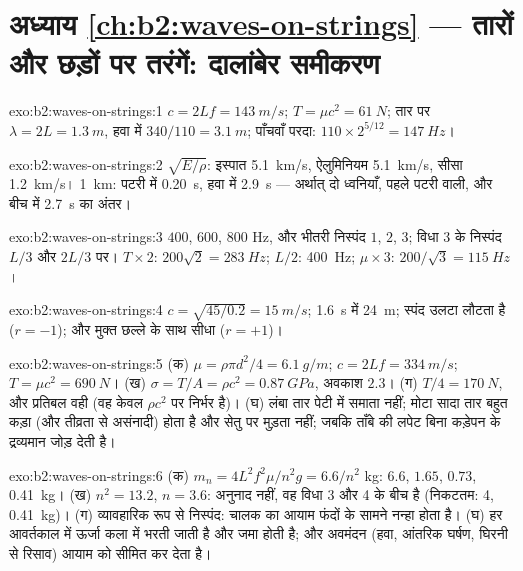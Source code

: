 \section*{अध्याय \ref{ch:b2:waves-on-strings} --- तारों और छड़ों पर तरंगें: दालांबेर समीकरण}

\begin{solution}{exo:b2:waves-on-strings:1}
$c = 2Lf = \qty{143}{m/s}$; $T = \mu c^2 = \qty{61}{N}$; तार पर $\lambda = 2L = \qty{1.3}{m}$,
हवा में $340/110 = \qty{3.1}{m}$; पाँचवाँ परदा: $110 \times 2^{5/12} =
\qty{147}{Hz}$।
\end{solution}

\begin{solution}{exo:b2:waves-on-strings:2}
$\sqrt{E/\rho}$: इस्पात \qty{5.1}{km/s}, ऐलुमिनियम \qty{5.1}{km/s}, सीसा
\qty{1.2}{km/s}। \qty{1}{km}: पटरी में \qty{0.20}{s}, हवा में \qty{2.9}{s} ---
अर्थात् दो ध्वनियाँ, पहले पटरी वाली, और बीच में \qty{2.7}{s} का अंतर।
\end{solution}

\begin{solution}{exo:b2:waves-on-strings:3}
$400$, $600$, $800$ Hz, और भीतरी निस्पंद $1$, $2$, $3$; विधा 3 के निस्पंद
$L/3$ और $2L/3$ पर। $T \times 2$: $200\sqrt2 = \qty{283}{Hz}$; $L/2$: \qty{400}{Hz}; $\mu
\times 3$: $200/\sqrt3 = \qty{115}{Hz}$।
\end{solution}

\begin{solution}{exo:b2:waves-on-strings:4}
$c = \sqrt{45/0.2} = \qty{15}{m/s}$; \qty{1.6}{s} में \qty{24}{m}; स्पंद उलटा
लौटता है ($r = -1$); और मुक्त छल्ले के साथ सीधा ($r = +1$)।
\end{solution}

\begin{solution}{exo:b2:waves-on-strings:5}
(क) $\mu = \rho\pi d^2/4 = \qty{6.1}{g/m}$; $c = 2Lf = \qty{334}{m/s}$; $T = \mu c^2 =
\qty{690}{N}$। (ख) $\sigma = T/A = \rho c^2 = \qty{0.87}{GPa}$, अवकाश $2.3$। (ग) $T/4 =
\qty{170}{N}$, और प्रतिबल वही (वह केवल $\rho c^2$ पर निर्भर है)। (घ) लंबा
तार पेटी में समाता नहीं; मोटा सादा तार बहुत कड़ा (और तीव्रता से
असंनादी) होता है और सेतु पर मुड़ता नहीं; जबकि ताँबे की लपेट
बिना कड़ेपन के द्रव्यमान जोड़ देती है।
\end{solution}

\begin{solution}{exo:b2:waves-on-strings:6}
(क) $m_n = 4L^2f^2\mu/n^2g = 6.6/n^2$ kg: $6.6$, $1.65$, $0.73$, \qty{0.41}{kg}। (ख)
$n^2 = 13.2$, $n = 3.6$: अनुनाद नहीं, वह विधा 3 और 4 के बीच है (निकटतम: 4,
\qty{0.41}{kg})। (ग) व्यावहारिक रूप से निस्पंद: चालक का आयाम फंदों के
सामने नन्हा होता है। (घ) हर आवर्तकाल में ऊर्जा कला में भरती जाती है और
जमा होती है; और अवमंदन (हवा, आंतरिक घर्षण, घिरनी से रिसाव) आयाम को
सीमित कर देता है।
\end{solution}

